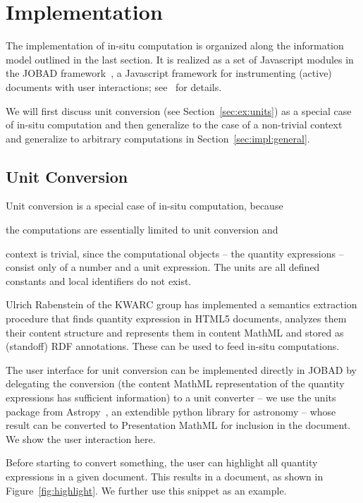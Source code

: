 \section{Implementation}\label{sec:impl}
The implementation of in-situ computation is organized along the information model outlined in
the last section.
It is realized as a set of Javascript modules in the JOBAD framework~\cite{JOBAD:on}, a Javascript framework for instrumenting (active) documents with user interactions; see~\cite{GLR:WebSvcActMathDoc09} for details.

We will first discuss unit conversion (see Section~\ref{sec:ex:units}) as a special case of in-situ computation and then generalize to the case of a non-trivial context and generalize to arbitrary computations in Section~\ref{sec:impl:general}.

\subsection{Unit Conversion}\label{sec:impl:units}
Unit conversion is a special case of in-situ computation, because
\begin{compactitem}
\item the computations are essentially limited to unit conversion and
\item context is trivial, since the computational objects -- the quantity expressions -- consist only of a number and a unit expression. The units are all defined constants and local identifiers do not exist.
\end{compactitem}
Ulrich Rabenstein of the KWARC group has implemented a semantics extraction procedure that finds quantity expression in HTML5 documents, analyzes them their content structure and represents them in content MathML and stored as (standoff) RDF annotations.
These can be used to feed in-situ computations.

The user interface for unit conversion can be implemented directly in JOBAD by delegating the conversion (the content MathML representation of the quantity expressions has sufficient information) to a unit converter -- we use the units package from Astropy~\cite{astropy}, an extendible python library for astronomy -- whose result can be converted to Presentation MathML for inclusion in the document.
We show the user interaction here.

Before starting to convert something, the user can highlight all quantity expressions in a given document.
This results in a document, as shown in Figure~\ref{fig:highlight}.
We further use this snippet as an example.

